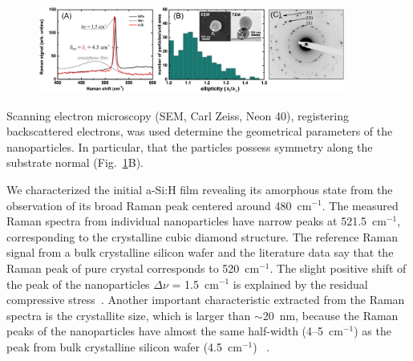         \subsubsection{}
            \begin{figure}[!ht]
                    \begin{center}
                        \includegraphics[width=0.9\textwidth]{figs/results/fab/Crystallinity.eps}
                    \end{center}
                    \caption{}
                    \label{fig:Crystallinity}
            \end{figure}

                Scanning electron microscopy (SEM, Carl Zeiss, Neon 40), registering backscattered electrons, was used
            determine the geometrical parameters of the nanoparticles. In particular, that the particles possess 
            symmetry along the substrate normal (Fig.~\ref{fig:Crystallinity}B).

                We characterized the initial a-Si:H film revealing its amorphous state from the observation of its broad Raman
            peak centered around 480~cm$^{-1}$. The measured Raman spectra from individual nanoparticles have narrow peaks at
            521.5~cm$^{-1}$, corresponding to the crystalline cubic diamond structure. The reference Raman signal from a bulk
            crystalline silicon wafer and the literature data say that the Raman peak of pure crystal corresponds to 520~cm$^{-1}$.
            The slight positive shift of the peak of the nanoparticles $\Delta$$\nu$ = 1.5~cm$^{-1}$ is explained by the
            residual compressive stress~\cite{de1996micro}. Another important characteristic extracted from the Raman spectra
            is the crystallite size, which is larger than $\sim$20~nm, because the Raman peaks of the nanoparticles have
            almost the same half-width (4--5~cm$^{-1}$) as the peak from bulk crystalline silicon wafer (4.5~cm$^{-1}$)
            ~\cite{campbell1986effects}.

